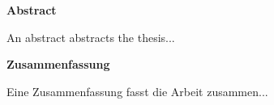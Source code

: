 

\clearemptydoublepage
{}
{}	

\begin{center}
{\large \bf Abstract}
\end{center}
An abstract abstracts the thesis...

\begin{center}
{\large \bf Zusammenfassung}
\end{center}
Eine Zusammenfassung fasst die Arbeit zusammen...
